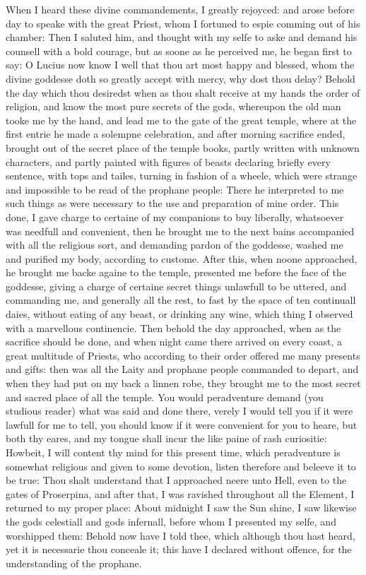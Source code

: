 When I heard these divine commandements, I greatly rejoyced: and arose before
day to speake with the great Priest, whom I fortuned to espie comming out of
his chamber: Then I saluted him, and thought with my selfe to aske and demand
his counsell with a bold courage, but as soone as he perceived me, he began
first to say: O Lucius now know I well that thou art most happy and blessed,
whom the divine goddesse doth so greatly accept with mercy, why dost thou
delay? Behold the day which thou desiredst when as thou shalt receive at my
hands the order of religion, and know the most pure secrets of the gods,
whereupon the old man tooke me by the hand, and lead me to the gate of the
great temple, where at the first entrie he made a solempne celebration, and
after morning sacrifice ended, brought out of the secret place of the temple
books, partly written with unknown characters, and partly painted with figures
of beasts declaring briefly every sentence, with tops and tailes, turning in
fashion of a wheele, which were strange and impossible to be read of the
prophane people: There he interpreted to me such things as were necessary to
the use and preparation of mine order. This done, I gave charge to certaine of
my companions to buy liberally, whatsoever was needfull and convenient, then he
brought me to the next bains accompanied with all the religious sort, and
demanding pardon of the goddesse, washed me and purified my body, according to
custome. After this, when noone approached, he brought me backe againe to the
temple, presented me before the face of the goddesse, giving a charge of
certaine secret things unlawfull to be uttered, and commanding me, and
generally all the rest, to fast by the space of ten continuall daies, without
eating of any beast, or drinking any wine, which thing I observed with a
marvellous continencie. Then behold the day approached, when as the sacrifice
should be done, and when night came there arrived on every coast, a great
multitude of Priests, who according to their order offered me many presents and
gifts: then was all the Laity and prophane people commanded to depart, and when
they had put on my back a linnen robe, they brought me to the most secret and
sacred place of all the temple. You would peradventure demand (you studious
reader) what was said and done there, verely I would tell you if it were
lawfull for me to tell, you should know if it were convenient for you to heare,
but both thy eares, and my tongue shall incur the like paine of rash
curiositie: Howbeit, I will content thy mind for this present time, which
peradventure is somewhat religious and given to some devotion, listen therefore
and beleeve it to be true: Thou shalt understand that I approached neere unto
Hell, even to the gates of Proserpina, and after that, I was ravished
throughout all the Element, I returned to my proper place: About midnight I saw
the Sun shine, I saw likewise the gods celestiall and gods infernall, before
whom I presented my selfe, and worshipped them: Behold now have I told thee,
which although thou hast heard, yet it is necessarie thou conceale it; this
have I declared without offence, for the understanding of the prophane.


